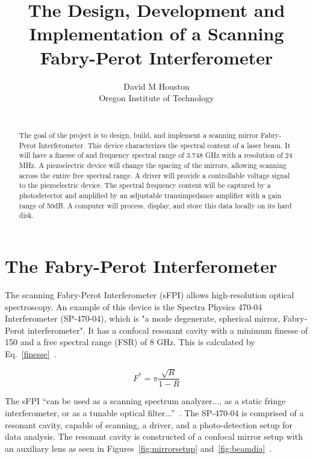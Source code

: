 \documentclass[12pt]{report}
\title{The Design, Development and Implementation of a Scanning Fabry-Perot Interferometer}
\author{David M Houston\\
		Oregon Institute of Technology\\\\
		}
\begin{document}
\maketitle
\tableofcontents
\listoffigures
\listoftables


\begin{abstract}
The goal of the project is to design, build, and implement a scanning mirror Fabry-Perot Interferometer. This device characterizes the spectral content of a laser beam. It will have a finesse of  and frequency spectral range of 3.748 GHz with a resolution of 24 MHz. 
A piezoelectric device will change the spacing of the mirrors, allowing scanning across the entire free spectral range. A driver will provide a controllable voltage signal to the piezoelectric device. The spectral frequency content will be captured by a photodetector and amplified by an adjustable transimpedance amplifier with a gain range of 50dB. A computer will process, display, and store this data locally on its hard disk.
\end{abstract}

\chapter[Background]{The Fabry-Perot Interferometer}
The scanning Fabry-Perot Interferometer (sFPI) allows high-resolution optical spectroscopy. An example of this device is the Spectra Physics 470-04 Interferometer (SP-470-04), which is "a mode degenerate, spherical mirror, Fabry-Perot interferometer". It has a confocal resonant cavity with a minimum finesse of 150 and a free spectral range (FSR) of 8 GHz. This is calculated by Eq.~\ref{finesse}~\cite{spectraphysics470}. 

\begin{equation}
F^* = \pi\frac{\sqrt{R}}{1-R}
\label{finesse}
\end{equation}

The sFPI ``can be used as a scanning spectrum analyzer..., as a static fringe interferometer, or as a tunable optical filter...''~\cite{spectraphysics470}. The SP-470-04 is comprised of a resonant cavity, capable of scanning, a driver, and a photo-detection setup for data analysis. The resonant cavity is constructed of a confocal mirror setup with an auxiliary lens as seen in Figures~\ref{fig:mirrorsetup} and~\ref{fig:beamdia}~\cite{hercher}.\\
\end{document}
